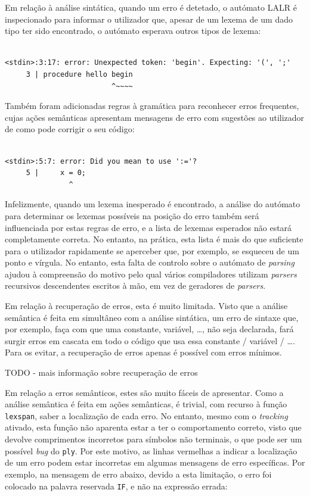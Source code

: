 \documentclass[12pt, a4paper]{article}
\begin{document}
Em relação à análise sintática, quando um erro é detetado, o autómato LALR é inspecionado para
informar o utilizador que, apesar de um lexema de um dado tipo ter sido encontrado, o autómato
esperava outros tipos de lexema:

\begin{lstlisting}

<stdin>:3:17: error: Unexpected token: 'begin'. Expecting: '(', ';'
     3 | procedure hello begin
                         ^~~~~
\end{lstlisting}

Também foram adicionadas regras à gramática para reconhecer erros frequentes, cujas ações semânticas
apresentam mensagens de erro com sugestões ao utilizador de como pode corrigir o seu código:

\begin{lstlisting}

<stdin>:5:7: error: Did you mean to use ':='?
     5 |     x = 0;
               ^
\end{lstlisting}

Infelizmente, quando um lexema inesperado é encontrado, a análise do autómato para determinar os
lexemas possíveis na posição do erro também será influenciada por estas regras de erro, e a lista
de lexemas esperados não estará completamente correta. No entanto, na prática, esta lista é mais
do que suficiente para o utilizador rapidamente se aperceber que, por exemplo, se esqueceu de um
ponto e vírgula. No entanto, esta falta de controlo sobre o autómato de \emph{parsing} ajudou à
compreensão do motivo pelo qual vários compiladores utilizam \emph{parsers} recursivos descendentes
escritos à mão, em vez de geradores de \emph{parsers}. \cite{compilers-handwritten-parser}

Em relação à recuperação de erros, esta é muito limitada. Visto que a análise semântica é feita em
simultâneo com a análise sintática, um erro de sintaxe que, por exemplo, faça com que uma constante,
variável, \ldots, não seja declarada, fará surgir erros em cascata em todo o código que usa essa
constante / variável / \ldots. Para os evitar, a recuperação de erros apenas é possível com erros
mínimos.

{\color{red} TODO - mais informação sobre recuperação de erros}

Em relação a erros semânticos, estes são muito fáceis de apresentar. Como a análise semântica é
feita em ações semânticas, é trivial, com recurso à função \texttt{lexspan}, saber a localização de
cada erro. No entanto, mesmo com o \emph{tracking} ativado, esta função não aparenta estar a ter o
comportamento correto, visto que devolve comprimentos incorretos para símbolos não terminais, o que
pode ser um possível \emph{bug} do \texttt{ply}. Por este motivo, as linhas vermelhas a indicar a
localização de um erro podem estar incorretas em algumas mensagens de erro específicas. Por exemplo,
na mensagem de erro abaixo, devido a esta limitação, o erro foi colocado na palavra reservada
\texttt{IF}, e não na expressão errada:
\end{document}
